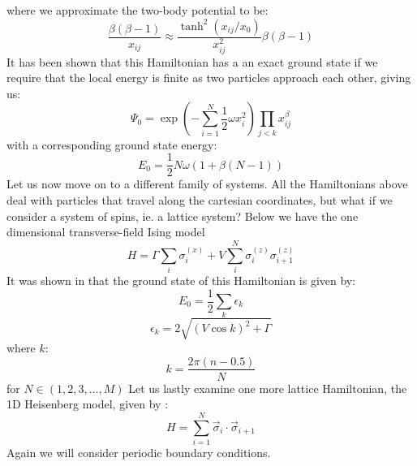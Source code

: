 \documentclass[12pt]{article}
\begin{document}
{\begin{equation}
\end{equation}
where we approximate the two-body potential to be:
\begin{equation*}
    \frac{\beta(\beta - 1)}{x_{ij}} \approx \frac{\tanh^2(x_{ij}/x_0)}{x_{ij}^2}\beta(\beta - 1)
\end{equation*}
It has been shown\cite{jane} that this Hamiltonian has a an exact ground state if we require that the local energy is finite as two particles approach each other, giving us:
\begin{equation*}
    \Psi_0 = \exp \left(- \sum_{i=1}^N \frac{1}{2} \omega x_i^2 \right) \prod_{j<k} x_{ij}^\beta
\end{equation*}
with a corresponding ground state energy:
\begin{equation*}
    E_0 = \frac{1}{2} N \omega (1 + \beta(N-1))
\end{equation*}
Let us now move on to a different family of systems. All the Hamiltonians above deal with particles that travel along the cartesian coordinates, but what if we consider a system of spins, ie. a lattice system?
\newline Below we have the one dimensional transverse-field Ising model \cite{nkising}
\begin{equation}
    H = \Gamma \sum_i \sigma_i^{(x)} + V \sum_i^N \sigma_i^{(z)} \sigma_{i+1}^{(z)}
\end{equation}
It was shown in \cite{pfeuty} that the ground state of this Hamiltonian is given by:
\begin{equation*}
    E_0 = \frac{1}{2} \sum_k \epsilon_k
\end{equation*}
\begin{equation*}
    \epsilon_k = 2 \sqrt{(V \cos k)^2 + \Gamma}
\end{equation*}
where $k$:
\begin{equation*}
    k = \frac{2\pi (n-0.5)}{N}
\end{equation*}
for $N \in (1, 2, 3, \dots, M)$
Let us lastly examine one more lattice Hamiltonian, the 1D Heisenberg model, given by \cite{nkheisenberg}:
\begin{equation}
    H = \sum_{i=1}^N \Vec{\sigma}_i \cdot \Vec{\sigma}_{i+1}
\end{equation}
Again we will consider periodic boundary conditions.
}
\end{document}
